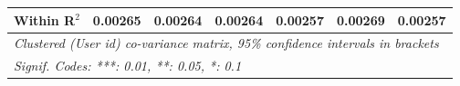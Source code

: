 \begin{table}[htbp]
\begin{threeparttable}[b]
\begin{tabular}{lcccccc}
         Within R$^2$                     & 0.00265         & 0.00264         & 0.00264         & 0.00257         & 0.00269         & 0.00257\\  
         \midrule \midrule
         \multicolumn{7}{l}{\emph{Clustered (User id) co-variance matrix, 95\% confidence intervals in brackets}}\\
         \multicolumn{7}{l}{\emph{Signif. Codes: ***: 0.01, **: 0.05, *: 0.1}}\\
      \end{tabular}
   \end{threeparttable}
\end{table}


